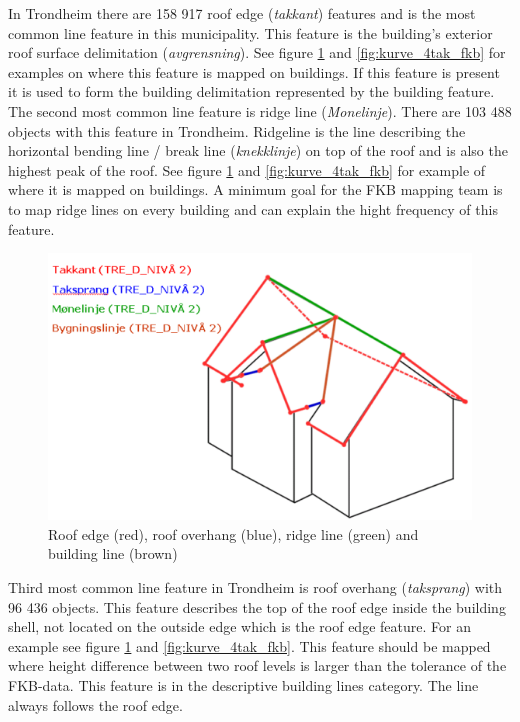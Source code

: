 In Trondheim there are 158 917 roof edge (\textit{takkant}) features and is the most common line feature in this municipality. This feature is the building's exterior roof surface delimitation (\textit{avgrensning}). See figure \ref{fig:kurve_tak_fkb} and \ref{fig:kurve_4tak_fkb} for examples on where this feature is mapped on buildings. If this feature is present it is used to form the building delimitation \cite{delimitation} represented by the building feature. The second most common line feature is ridge line (\textit{Monelinje}). There are 103 488 objects with this feature in Trondheim. Ridgeline is the line describing the horizontal bending line / break line (\textit{knekklinje}) on top of the roof and is also the highest peak of the roof. See figure \ref{fig:kurve_tak_fkb} and \ref{fig:kurve_4tak_fkb} for example of where it is mapped on buildings. A minimum goal for the FKB mapping team is to map ridge lines on every building \cite{Kartverket2013a} and can explain the hight frequency of this feature. 

\begin{figure}[H]
    \centering
    \includegraphics[scale=0.5]{figures/kurve_4tak_fkb.png}
    \caption{Roof edge (red), roof overhang (blue), ridge line (green) and building line (brown) \cite{Kartverket2013a}}
    \label{fig:kurve_tak_fkb}
\end{figure} 

Third most common line feature in Trondheim is roof overhang (\textit{taksprang}) with 96 436 objects. This feature describes the top of the roof edge inside the building shell, not located on the outside edge which is the roof edge feature. For an example see figure \ref{fig:kurve_tak_fkb} and \ref{fig:kurve_4tak_fkb}. This feature should be mapped where height difference between two roof levels is larger than the tolerance of the FKB-data. This feature is in the descriptive building lines category. The line always follows the roof edge. 

